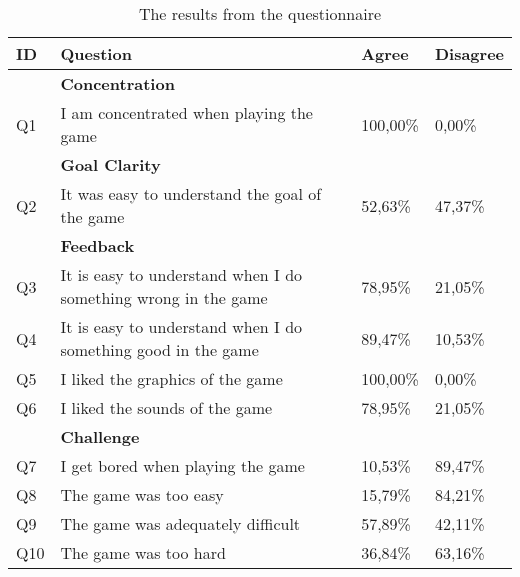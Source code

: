 \begin{table}[]
	\centering
	\caption{The results from the questionnaire}
	\label{tab:simple_results}
	\begin{tabularx}{\textwidth}{|l|X|l|l|}
		\hline
		\textbf{ID} & \textbf{Question}                                              & \textbf{Agree} & \textbf{Disagree} \\ \hline
		\textbf{}   & \textbf{Concentration}                                         & \textbf{}      & \textbf{}         \\ \hline
		Q1          & I am concentrated when playing the game                        & 100,00\%       & 0,00\%            \\ \hline
		\textbf{}   & \textbf{Goal Clarity}                                          & \textbf{}      & \textbf{}         \\ \hline
		Q2          & It was easy to understand the goal of the game                 & 52,63\%        & 47,37\%           \\ \hline
		\textbf{}   & \textbf{Feedback}                                              & \textbf{}      & \textbf{}         \\ \hline
		Q3          & It is easy to understand when I do something wrong in the game & 78,95\%        & 21,05\%           \\ \hline
		Q4          & It is easy to understand when I do something good in the game  & 89,47\%        & 10,53\%           \\ \hline
		Q5          & I liked the graphics of the game                               & 100,00\%       & 0,00\%            \\ \hline
		Q6          & I liked the sounds of the game                                 & 78,95\%        & 21,05\%           \\ \hline
		\textbf{}   & \textbf{Challenge}                                             & \textbf{}      & \textbf{}         \\ \hline
		Q7          & I get bored when playing the game                              & 10,53\%        & 89,47\%           \\ \hline
		Q8          & The game was too easy                                          & 15,79\%        & 84,21\%           \\ \hline
		Q9          & The game was adequately difficult                              & 57,89\%        & 42,11\%           \\ \hline
		Q10         & The game was too hard                                          & 36,84\%        & 63,16\%           \\ \hline

\end{tabularx}
\end{table}
